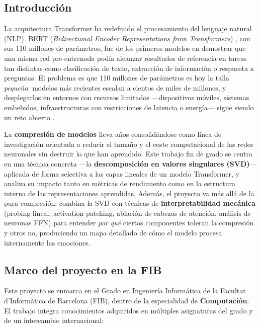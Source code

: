 \documentclass[11pt, a4paper]{article}
\begin{document}
\subsection{Introducción}

La arquitectura Transformer \cite{vaswani2017attention} ha redefinido el procesamiento del lenguaje natural (NLP). BERT (\textit{Bidirectional Encoder Representations from Transformers}) \cite{devlin2019bert}, con sus 110 millones de parámetros, fue de los primeros modelos en demostrar que una misma red pre-entrenada podía alcanzar resultados de referencia en tareas tan distintas como clasificación de texto, extracción de información o respuesta a preguntas. El problema es que 110 millones de parámetros es hoy la talla \textit{pequeña}: modelos más recientes escalan a cientos de miles de millones, y desplegarlos en entornos con recursos limitados ---dispositivos móviles, sistemas embebidos, infraestructuras con restricciones de latencia o energía--- sigue siendo un reto abierto \cite{strubell2019energy}.

La \textbf{compresión de modelos} lleva años consolidándose como línea de investigación orientada a reducir el tamaño y el coste computacional de las redes neuronales sin destruir lo que han aprendido. Este trabajo fin de grado se centra en una técnica concreta ---la \textbf{descomposición en valores singulares (SVD)}--- aplicada de forma selectiva a las capas lineales de un modelo Transformer, y analiza su impacto tanto en métricas de rendimiento como en la estructura interna de las representaciones aprendidas. Además, el proyecto va más allá de la pura compresión: combina la SVD con técnicas de \textbf{interpretabilidad mecánica} (probing lineal, activation patching, ablación de cabezas de atención, análisis de neuronas FFN) para entender \textit{por qué} ciertos componentes toleran la compresión y otros no, produciendo un mapa detallado de cómo el modelo procesa internamente las emociones.

\subsection{Marco del proyecto en la FIB}

Este proyecto se enmarca en el Grado en Ingeniería Informática de la Facultat d'Informàtica de Barcelona (FIB), dentro de la especialidad de \textbf{Computación}. El trabajo integra conocimientos adquiridos en múltiples asignaturas del grado y de un intercambio internacional:
\end{document}
